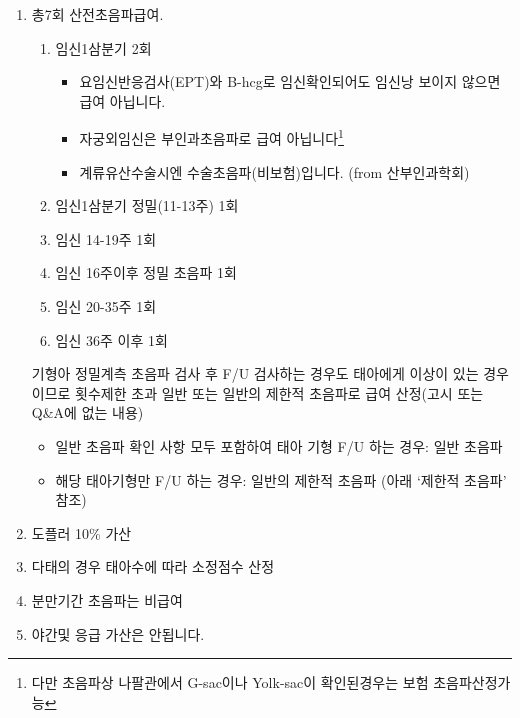 \begin{enumerate}[1.]\tightlist
\item 총7회 산전초음파급여. %
	\begin{enumerate}[①]\tightlist
	\item 임신1삼분기 2회
	\begin{commentbox}{}%
	\begin{itemize}\tightlist
	\item 요임신반응검사(EPT)와 B-hcg로 임신확인되어도 임신낭 보이지 않으면 급여 아닙니다. 
	\item 자궁외임신은 부인과초음파로 급여 아닙니다\footnote{다만 초음파상 나팔관에서 G-sac이나 Yolk-sac이 확인된경우는 보험 초음파산정가능}%
	\item 계류유산수술시엔 수술초음파(비보험)입니다. (from 산부인과학회)
	\end{itemize}
	\end{commentbox}%
	
	\item 임신1삼분기 정밀(11-13주) 1회
	\item 임신 14-19주 1회
	\item 임신 16주이후 정밀 초음파 1회
	\item 임신 20-35주 1회
	\item 임신 36주 이후 1회
	\end{enumerate}
	\begin{commentbox}{}%
	기형아 정밀계측 초음파 검사 후 F/U 검사하는 경우도 태아에게 이상이 있는 경우이므로 횟수제한 초과 일반 또는 일반의 제한적 초음파로 급여 산정(고시 또는 \textsf{Q\&A}에 없는 내용)
	\begin{itemize}\tightlist
	\item 일반 초음파 확인 사항 모두 포함하여 태아 기형 F/U 하는 경우: 일반 초음파
	\item 해당 태아기형만 F/U 하는 경우: 일반의 제한적 초음파 (아래 ‘제한적 초음파’ 참조)
	\end{itemize}
	\end{commentbox}%
\item 도플러 10\% 가산
\item 다태의 경우 태아수에 따라 소정점수 산정
\item 분만기간 초음파는 비급여
\item 야간및 응급 가산은 안됩니다.
\end{enumerate}
